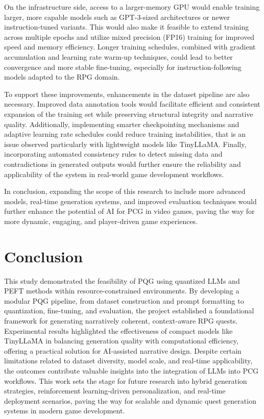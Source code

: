 On the infrastructure side, access to a larger-memory GPU would enable training
larger, more capable models such as GPT-3-sized architectures or newer instruction-tuned
variants. This would also make it feasible to extend training across multiple epochs
and utilize mixed precision (FP16) training for improved speed and memory efficiency.
Longer training schedules, combined with gradient accumulation and learning rate warm-up
techniques, could lead to better convergence and more stable fine-tuning, especially
for instruction-following models adapted to the RPG domain.

To support these improvements, enhancements in the dataset pipeline are also necessary.
Improved data annotation tools would facilitate efficient and consistent expansion of 
the training set while preserving structural integrity and narrative quality. Additionally,
implementing smarter checkpointing mechanisms and adaptive learning rate schedules
could reduce training instabilities, that is an issue observed particularly with lightweight
models like TinyLLaMA. Finally, incorporating automated consistency rules to detect
missing data and contradictions in generated outputs would further ensure the reliability
and applicability of the system in real-world game development workflows.

In conclusion, expanding the scope of this research to include more advanced models,
real-time generation systems, and improved evaluation techniques would further enhance
the potential of AI for PCG in video games, paving the way for more dynamic, engaging,
and player-driven game experiences.

\section{Conclusion}

This study demonstrated the feasibility of PQG using quantized LLMs and PEFT methods
within resource-constrained environments. By developing a modular PQG pipeline,
from dataset construction and prompt formatting to quantization, fine-tuning, and evaluation,
the project established a foundational framework for generating narratively
coherent, context-aware RPG quests. Experimental results highlighted the effectiveness
of compact models like TinyLLaMA in balancing generation quality with computational
efficiency, offering a practical solution for AI-assisted narrative design. Despite certain limitations
related to dataset diversity, model scale, and real-time applicability, the outcomes contribute
valuable insights into the integration of LLMs into PCG workflows. This work
sets the stage for future research into hybrid generation strategies, reinforcement learning-driven
personalization, and real-time deployment scenarios, paving the way for scalable
and dynamic quest generation systems in modern game development.

\newpage
